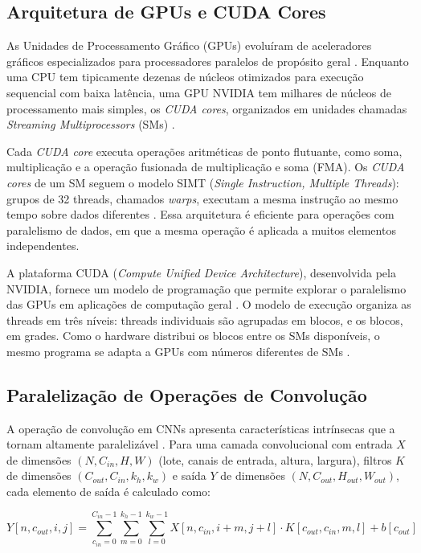 \subsection{Arquitetura de GPUs e CUDA Cores}

As Unidades de Processamento Gráfico (GPUs) evoluíram de aceleradores gráficos especializados para processadores paralelos de propósito geral \cite{CUDA_Programming}. Enquanto uma CPU tem tipicamente dezenas de núcleos otimizados para execução sequencial com baixa latência, uma GPU NVIDIA tem milhares de núcleos de processamento mais simples, os \textit{CUDA cores}, organizados em unidades chamadas \textit{Streaming Multiprocessors} (SMs) \cite{CUDA_Programming}.

Cada \textit{CUDA core} executa operações aritméticas de ponto flutuante, como soma, multiplicação e a operação fusionada de multiplicação e soma (FMA). Os \textit{CUDA cores} de um SM seguem o modelo SIMT (\textit{Single Instruction, Multiple Threads}): grupos de 32 threads, chamados \textit{warps}, executam a mesma instrução ao mesmo tempo sobre dados diferentes \cite{CUDA_Programming}. Essa arquitetura é eficiente para operações com paralelismo de dados, em que a mesma operação é aplicada a muitos elementos independentes.

A plataforma CUDA (\textit{Compute Unified Device Architecture}), desenvolvida pela NVIDIA, fornece um modelo de programação que permite explorar o paralelismo das GPUs em aplicações de computação geral \cite{CUDA_Programming}. O modelo de execução organiza as threads em três níveis: threads individuais são agrupadas em blocos, e os blocos, em grades. Como o hardware distribui os blocos entre os SMs disponíveis, o mesmo programa se adapta a GPUs com números diferentes de SMs \cite{CUDA_Architecture}.

\subsection{Paralelização de Operações de Convolução}

A operação de convolução em CNNs apresenta características intrínsecas que a tornam altamente paralelizável \cite{cuConv}. Para uma camada convolucional com entrada $X$ de dimensões $(N, C_{in}, H, W)$ (lote, canais de entrada, altura, largura), filtros $K$ de dimensões $(C_{out}, C_{in}, k_h, k_w)$ e saída $Y$ de dimensões $(N, C_{out}, H_{out}, W_{out})$, cada elemento de saída é calculado como:

\begin{equation}
Y[n, c_{out}, i, j] = \sum_{c_{in}=0}^{C_{in}-1} \sum_{m=0}^{k_h-1} \sum_{l=0}^{k_w-1} X[n, c_{in}, i+m, j+l] \cdot K[c_{out}, c_{in}, m, l] + b[c_{out}]
\end{equation}

